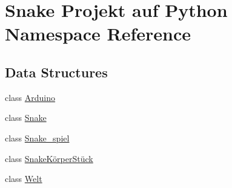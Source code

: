 \hypertarget{namespace_snake_01_projekt_01auf_01_python}{}\section{Snake Projekt auf Python Namespace Reference}
\label{namespace_snake_01_projekt_01auf_01_python}
\subsection*{Data Structures}
\begin{DoxyCompactItemize}
\item 
class \mbox{\hyperlink{class_snake_01_projekt_01auf_01_python_1_1_arduino}{Arduino}}
\item 
class \mbox{\hyperlink{class_snake_01_projekt_01auf_01_python_1_1_snake}{Snake}}
\item 
class \mbox{\hyperlink{class_snake_01_projekt_01auf_01_python_1_1_snake__spiel}{Snake\+\_\+spiel}}
\item 
class \mbox{\hyperlink{class_snake_01_projekt_01auf_01_python_1_1_snake_k_xC3_xB6rper_st_xC3_xBCck}{Snake\+Körper\+Stück}}
\item 
class \mbox{\hyperlink{class_snake_01_projekt_01auf_01_python_1_1_welt}{Welt}}
\end{DoxyCompactItemize}
